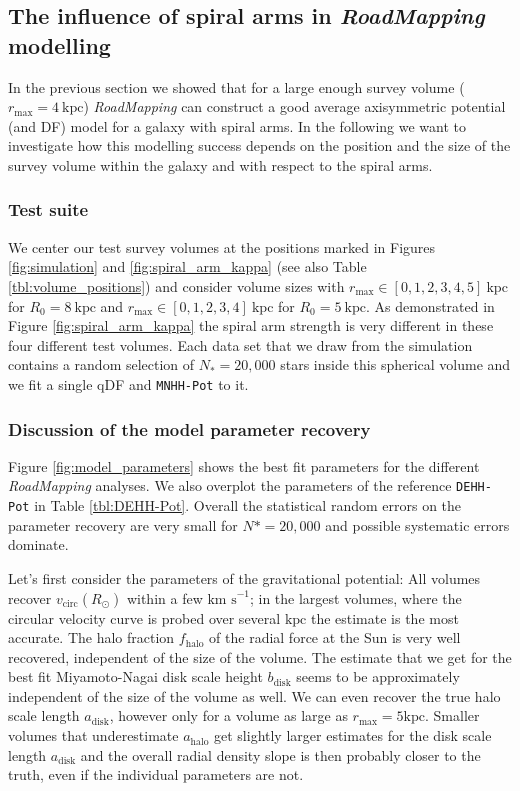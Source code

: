 \documentclass[iop,revtex4,numberedappendix,appendixfloats]{emulateapj}
\newcommand{\RM}{{\sl RoadMapping}}
\begin{document}
\subsection{The influence of spiral arms in \RM{} modelling} \label{sec:results_part2}

In the previous section we showed that for a large enough survey volume ($r_\text{max}=4~\text{kpc}$) \RM{} can construct a good average axisymmetric potential (and DF) model for a galaxy with spiral arms. In the following we want to investigate how this modelling success depends on the position and the size of the survey volume within the galaxy and with respect to the spiral arms.

\subsubsection{Test suite}

We center our test survey volumes at the positions marked in Figures \ref{fig:simulation} and \ref{fig:spiral_arm_kappa} (see also Table \ref{tbl:volume_positions}) and consider volume sizes with $r_\text{max} \in [0,1,2,3,4,5]~\text{kpc}$ for $R_0 = 8~\text{kpc}$ and $r_\text{max} \in [0,1,2,3,4]~\text{kpc}$ for $R_0 = 5~\text{kpc}$. As demonstrated in Figure \ref{fig:spiral_arm_kappa} the spiral arm strength is very different in these four different test volumes. Each data set that we draw from the simulation contains a random selection of $N_*=20,000$ stars inside this spherical volume and we fit a single qDF and \texttt{MNHH-Pot} to it. 

\subsubsection{Discussion of the model parameter recovery} \label{sec:parameter recovery}

Figure \ref{fig:model_parameters} shows the best fit parameters for the different \RM{} analyses. We also overplot the parameters of the reference \texttt{DEHH-Pot} in Table \ref{tbl:DEHH-Pot}. Overall the statistical random errors on the parameter recovery are very small for $N*=20,000$ and possible systematic errors dominate. 

Let's first consider the parameters of the gravitational potential: All volumes recover $v_\text{circ}(R_\odot)$ within a few $\text{km s}^{-1}$; in the largest volumes, where the circular velocity curve is probed over several $\text{kpc}$ the estimate is the most accurate. The halo fraction $f_\text{halo}$ of the radial force at the Sun is very well recovered, independent of the size of the volume. The estimate that we get for the best fit Miyamoto-Nagai disk scale height $b_\text{disk}$ seems to be approximately independent of the size of the volume as well. We can even recover the true halo scale length $a_\text{disk}$, however only for a volume as large as $r_\text{max}=5\text{kpc}$. Smaller volumes that underestimate $a_\text{halo}$ get slightly larger estimates for the disk scale length $a_\text{disk}$ and the overall radial density slope is then probably closer to the truth, even if the individual parameters are not.
\end{document}
